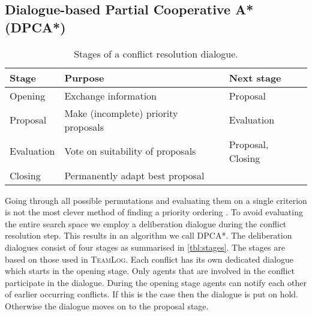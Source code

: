 \subsection{Dialogue-based Partial Cooperative A* (DPCA*)}
\begin{table}
    \centering
    \caption{Stages of a conflict resolution dialogue.}
    \label{tbl:stages}
    \begin{tabularx}{\columnwidth}{l|X|l}
        Stage & Purpose & Next stage \\ \hline
        Opening & Exchange information & Proposal \\
        Proposal & Make (incomplete) priority proposals & Evaluation \\
        Evaluation & Vote on suitability of proposals & Proposal, Closing \\
        Closing & Permanently adapt best proposal & \\
    \end{tabularx}
\end{table}

Going through all possible permutations and evaluating them on a single
criterion is not the most clever method of finding a priority ordering
\cite{bennewitz2002}. To avoid evaluating the entire search space we employ a
deliberation dialogue during the conflict resolution step. This results in an
algorithm we call DPCA*. The deliberation dialogues consist of four stages as
summarised in \autoref{tbl:stages}. The stages are based on those used in
\textsc{TeamLog}. Each conflict has its own dedicated dialogue which starts in
the opening stage. Only agents that are involved in the conflict participate in
the dialogue. During the opening stage agents can notify each other of earlier
occurring conflicts. If this is the case then the dialogue is put on hold.
Otherwise the dialogue moves on to the proposal stage.

